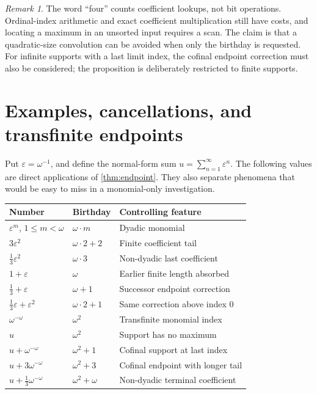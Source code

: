 \documentclass[11pt,letterpaper]{article}
\theoremstyle{definition}
\theoremstyle{remark}
\newtheorem{remark}[theorem]{Remark}
\newcommand{\ep}{\varepsilon}
\begin{document}
\begin{remark}
The word ``four'' counts coefficient lookups, not bit operations.
Ordinal-index arithmetic and exact coefficient multiplication still have
costs, and locating a maximum in an unsorted input requires a scan.
The claim is that a quadratic-size convolution can be avoided when only
the birthday is requested. For infinite supports with a last limit index,
the cofinal endpoint correction must also be considered; the proposition
is deliberately restricted to finite supports.
\end{remark}

\section{Examples, cancellations, and transfinite endpoints}

Put \(\ep=\omega^{-1}\), and define the normal-form sum
\(u=\sum_{n=1}^{\infty}\ep^n\). The following values are direct
applications of \cref{thm:endpoint}. They also separate phenomena that
would be easy to miss in a monomial-only investigation.

\begin{center}
\renewcommand{\arraystretch}{1.28}
\begin{tabular}{@{}>{\raggedright\arraybackslash}p{}>{\raggedright\arraybackslash}p{}>{\raggedright\arraybackslash}p{}@{}}
\toprule
\textbf{Number} & \textbf{Birthday} & \textbf{Controlling feature}\\
\midrule
\(\ep^m\), \(1\leq m<\omega\) & \(\omega\cdot m\) & Dyadic monomial\\
\(3\ep^2\) & \(\omega\cdot2+2\) & Finite coefficient tail\\
\(\tfrac13\ep^2\) & \(\omega\cdot3\) & Non-dyadic last coefficient\\
\(1+\ep\) & \(\omega\) & Earlier finite length absorbed\\
\(\tfrac13+\ep\) & \(\omega+1\) & Successor endpoint correction\\
\(\tfrac13\ep+\ep^2\) & \(\omega\cdot2+1\) & Same correction above index 0\\
\(\omega^{-\omega}\) & \(\omega^2\) & Transfinite monomial index\\
\(u\) & \(\omega^2\) & Support has no maximum\\
\(u+\omega^{-\omega}\) & \(\omega^2+1\) & Cofinal support at last index\\
\(u+3\omega^{-\omega}\) & \(\omega^2+3\) & Cofinal endpoint with longer tail\\
\(u+\tfrac13\omega^{-\omega}\) & \(\omega^2+\omega\) & Non-dyadic terminal coefficient\\
\bottomrule
\end{tabular}
\end{center}
\end{document}
